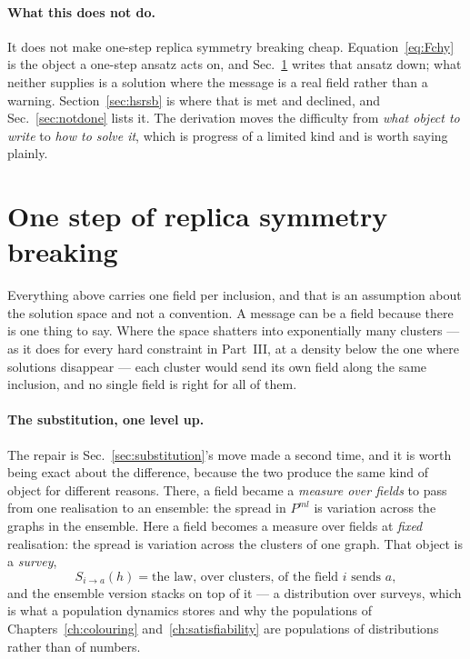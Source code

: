 \paragraph{What this does not do.} It does not make one-step replica symmetry
breaking cheap. Equation~\eqref{eq:Fchy} is the object a one-step ansatz acts
on, and Sec.~\ref{sec:onestep} writes that ansatz down; what neither supplies is
a solution where the message is a real field rather than a warning.
Section~\ref{sec:hsrsb} is where that is met and declined, and
Sec.~\ref{sec:notdone} lists it. The derivation moves the difficulty from
\emph{what object to write} to \emph{how to solve it}, which is progress of a
limited kind and is worth saying plainly.

\section{One step of replica symmetry breaking}
\label{sec:onestep}

Everything above carries one field per inclusion, and that is an assumption
about the solution space and not a convention. A message can be a field because
there is one thing to say. Where the space shatters into exponentially many
clusters --- as it does for every hard constraint in Part~III, at a density
below the one where solutions disappear --- each cluster would send its own
field along the same inclusion, and no single field is right for all of them.

\paragraph{The substitution, one level up.} The repair is
Sec.~\ref{sec:substitution}'s move made a second time, and it is worth being
exact about the difference, because the two produce the same kind of object for
different reasons. There, a field became a \emph{measure over fields} to pass
from one realisation to an ensemble: the spread in $P^{ml}$ is variation across
the graphs in the ensemble. Here a field becomes a measure over fields at
\emph{fixed} realisation: the spread is variation across the clusters of one
graph. That object is a \emph{survey},
\begin{equation}
  S_{i\to a}(h)=\text{the law, over clusters, of the field }i\text{ sends }a,
  \label{eq:survey}
\end{equation}
and the ensemble version stacks on top of it --- a distribution over surveys,
which is what a population dynamics stores and why the populations of
Chapters~\ref{ch:colouring} and~\ref{ch:satisfiability} are populations of
distributions rather than of numbers.

